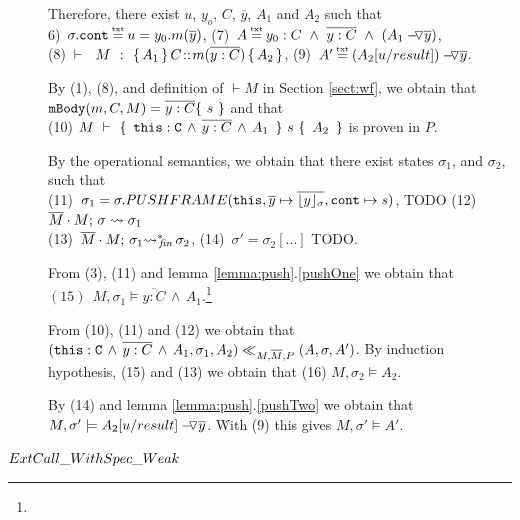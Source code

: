 \begin{description}
\item[ {}]

Therefore, there exist $u$, $y_o$, $C$, $\overline y$,  $A_1$ and $A_2$ such that \\
6)\ $\sigma.\prg{cont}\txteq u=y_0.m(\overline y)$,   \hspace{2cm}
 (7)\ $A \txteq y_0:C  \ \wedge\ \overline {y:C}\ \wedge \  (\PushAS  {y} {A_1})$, 
\\
 (8)\ $\promises M {\mprepost{A_1}{C}{m}{y}{C}{  {A_2}} }$,    \hspace{1cm}
 (9)\ $A' \txteq  {\PushAS  {y} {(A_2[ u/result])}}$. 

By (1), (8), and definition of $\vdash M$ in Section \ref{sect:wf}, we obtain that   $\prg{mBody}(m,C,M)=\overline{y:C}\{\  s \ \}$ and that\\
(10)   ${\hproves{M} { \ \prg{this}:\prg{C}\, \wedge\, \overline{y:C}\, \wedge\, A_1\  } {\ s\ } {\ A_2\ } }$ is proven in $P$.
 
 By the operational semantics, we obtain that there exist states $\sigma_1$, and $\sigma_2$, such that \\
 (11)\ $\sigma_1=\sigma.PUSHFRAME(\prg{this}, {\overline y} \mapsto \overline{\interpret {\sigma} y},\prg{cont} \mapsto s) $, TODO   \hspace{1cm}
   (12)\ $\leadstoBounded  {\Mtwo\cdot M}  {\sigma}  {\sigma_1}$ \\
 (13)\ $\leadstoBoundedStarFin {\Mtwo\cdot M}  {\sigma_1}  {\sigma_2}$,   \hspace{3cm}
 (14)\ $\sigma'=\sigma_2[...]$ TODO.
 
 From (3), (11) and lemma \ref{lemma:push}.\ref{pushOne}  we obtain that \ \ \  $ (15) \ \ M, \sigma_1 \models \overline{y:C}\, \wedge\, A_1$.\footnote{}
 
 From (10), (11) and (12) we obtain that $( \prg{this}:\prg{C}\, \wedge\, \overline{y:C}\, \wedge\, A_1,\sigma_1,A_2) \ll_{M,\Mtwo,P} (A,\sigma,A')$. By induction hypothesis, (15) and (13) we obtain that (16) $M,\sigma_2 \models A_2$.
 
 By (14) and lemma  \ref{lemma:push}.\ref{pushTwo}  we obtain that 
\ \ $M,\sigma' \models \PushAS  {y} {A_2[ u/result]}$. \. With (9) this gives $M,\sigma' \models A'$.

\item[${\sc{ExtCall\_WithSpec\_Weak}}$]


\end{description}
